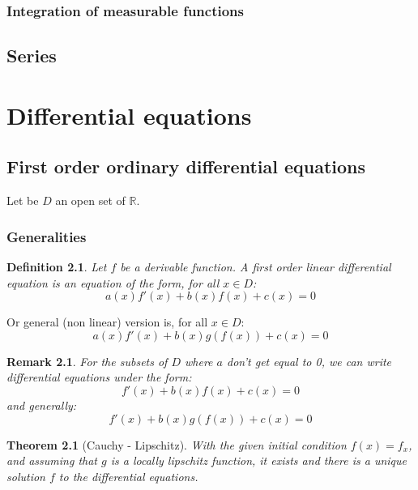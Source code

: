 \documentclass[french,12pt,a4paper]{book}
\newcommand{\R}{\mathbb{R}}
\newtheorem{theo}{Theorem}[chapter]
\newtheorem{defin}{Definition}[chapter]
\newtheorem{rem}{Remark}[chapter]
\numberwithin{equation}{chapter}
\begin{document}
\subsection{Integration of measurable functions}

\section{Series}

\chapter{Differential equations}

\section{First order ordinary differential equations}
Let be $D$ an open set of $\R$.

\subsection{Generalities}

\begin{defin}
Let $f$ be a derivable function. A first order linear differential equation is an equation of the form, for all $x \in D$:
$$a(x) f'(x) + b(x)f(x) + c(x) = 0$$
\end{defin}

Or general (non linear) version is, for all $x \in D$:
$$a(x)f'(x) +  b(x)g(f(x)) + c(x) = 0$$

\begin{rem}
For the subsets of $D$ where $a$ don't get equal to 0, we can write differential equations under the form:
$$f'(x) + b(x)f(x) + c(x) = 0$$
and generally:
$$f'(x) +  b(x)g(f(x)) + c(x) = 0$$
\end{rem}

\begin{theo}[Cauchy - Lipschitz]
With the given initial condition $f(x) = f_x$, and assuming that $g$ is a locally lipschitz function, it exists and there is a unique solution $f$ to the differential equations.
\end{theo}
\end{document}
